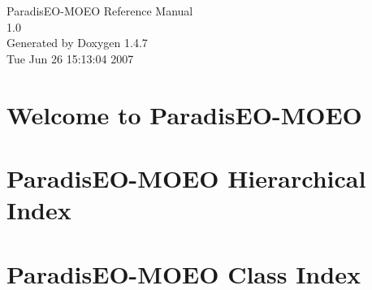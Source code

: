 \documentclass[a4paper]{book}
\begin{document}
\begin{titlepage}
\vspace*{7cm}
\begin{center}
{\Large Paradis\-EO-MOEO Reference Manual\\[1ex]\large 1.0 }\\
\vspace*{1cm}
{\large Generated by Doxygen 1.4.7}\\
\vspace*{0.5cm}
{\small Tue Jun 26 15:13:04 2007}\\
\end{center}
\end{titlepage}
\clearemptydoublepage
{}
\tableofcontents
\clearemptydoublepage
{}
\chapter{Welcome to Paradis\-EO-MOEO }
\label{index}
\chapter{Paradis\-EO-MOEO Hierarchical Index}

\chapter{Paradis\-EO-MOEO Class Index}

\end{document}
